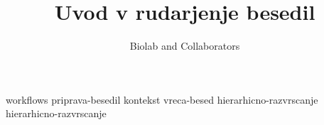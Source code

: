 \documentclass[symmetric, justified, a4paper]{tufte-book}
\title{Uvod v rudarjenje besedil}
\author[Biolab and Collaborators]{Biolab and Collaborators}
\begin{document}
\frontmatter

\maketitle



\tableofcontents

% 

\mainmatter



{workflows}
{priprava-besedil}
{kontekst}
{vreca-besed}
{hierarhicno-razvrscanje}
{hierarhicno-razvrscanje}


\backmatter





\printindex
\end{document}
